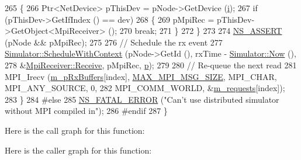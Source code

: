 \begin{DoxyCode}
265         \{
266           Ptr<NetDevice> pThisDev = pNode->GetDevice (\hyperlink{bernuolliDistribution_8m_a6f6ccfcf58b31cb6412107d9d5281426}{i});
267           \textcolor{keywordflow}{if} (pThisDev->GetIfIndex () == dev)
268             \{
269               pMpiRec = pThisDev->GetObject<MpiReceiver> ();
270               \textcolor{keywordflow}{break};
271             \}
272         \}
273 
274       \hyperlink{assert_8h_a6dccdb0de9b252f60088ce281c49d052}{NS\_ASSERT} (pNode && pMpiRec);
275 
276       \textcolor{comment}{// Schedule the rx event}
277       \hyperlink{classns3_1_1Simulator_a86dbaef45a15a42365d7d2ae550449f6}{Simulator::ScheduleWithContext} (pNode->GetId (), rxTime - 
      \hyperlink{classns3_1_1Simulator_ac3178fa975b419f7875e7105be122800}{Simulator::Now} (),
278                                       &\hyperlink{classns3_1_1MpiReceiver_a5c5506ca706198f61eaa2e550eca7ff3}{MpiReceiver::Receive}, pMpiRec, 
      \hyperlink{lte__link__budget_8m_ac9de518908a968428863f829398a4e62}{p});
279 
280       \textcolor{comment}{// Re-queue the next read}
281       MPI\_Irecv (\hyperlink{classns3_1_1GrantedTimeWindowMpiInterface_a93d55e9d2243e6839d0944c6b5587f03}{m\_pRxBuffers}[index], \hyperlink{namespacens3_acc821d14dfe483841d1f00caadad96d5}{MAX\_MPI\_MSG\_SIZE}, MPI\_CHAR, 
      MPI\_ANY\_SOURCE, 0,
282                  MPI\_COMM\_WORLD, &\hyperlink{classns3_1_1GrantedTimeWindowMpiInterface_a6d0d65442212c4017dca88cb86a06069}{m\_requests}[index]);
283     \}
284 \textcolor{preprocessor}{#else}
285   \hyperlink{group__fatal_ga5131d5e3f75d7d4cbfd706ac456fdc85}{NS\_FATAL\_ERROR} (\textcolor{stringliteral}{"Can't use distributed simulator without MPI compiled in"});
286 \textcolor{preprocessor}{#endif}
287 \}
\end{DoxyCode}


Here is the call graph for this function\+:




Here is the caller graph for this function\+:


